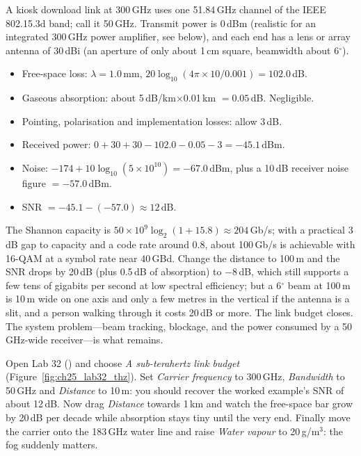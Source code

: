 \begin{worked}
A kiosk download link at 300\,GHz uses one 51.84\,GHz channel of the IEEE 802.15.3d band; call it
50\,GHz.
Transmit power is 0\,dBm (realistic for an integrated 300\,GHz power amplifier, see below), and each
end has a lens or array antenna of 30\,dBi (an aperture of only about 1\,cm square, beamwidth about
6$^\circ$).
\begin{itemize}
\item Free-space loss: $\lambda=1.0$\,mm, $20\log_{10}(4\pi\times10/0.001)=102.0$\,dB.
\item Gaseous absorption: about 5\,dB/km$\times$0.01\,km $=0.05$\,dB. Negligible.
\item Pointing, polarisation and implementation losses: allow 3\,dB.
\item Received power: $0+30+30-102.0-0.05-3=-45.1$\,dBm.
\item Noise: $-174+10\log_{10}(5\times10^{10})=-67.0$\,dBm, plus a 10\,dB receiver noise figure
$=-57.0$\,dBm.
\item SNR $=-45.1-(-57.0)\approx12$\,dB.
\end{itemize}
The Shannon capacity is $50\times10^9\log_2(1+15.8)\approx204$\,Gb/s; with a practical 3\,dB gap to
capacity and a code rate around 0.8, about 100\,Gb/s is achievable with 16-QAM at a symbol rate near
40\,GBd. Change the distance to 100\,m and the SNR drops by 20\,dB (plus 0.5\,dB of absorption) to
$-8$\,dB, which still supports a few tens of gigabits per second at low spectral efficiency; but a
6$^\circ$ beam at 100\,m is 10\,m wide on one axis and only a few metres in the vertical if the
antenna is a slit, and a person walking through it costs 20\,dB or more. The link budget closes. The
system problem---beam tracking, blockage, and the power consumed by a 50\,GHz-wide receiver---is what
remains.
\end{worked}


\begin{tryit}
Open Lab 32 () and choose \emph{A sub-terahertz link budget}
(Figure~\ref{fig:ch25_lab32_thz}). Set \emph{Carrier frequency} to 300\,GHz, \emph{Bandwidth} to
50\,GHz and \emph{Distance} to 10\,m: you should recover the worked example's SNR of about 12\,dB.
Now drag \emph{Distance} towards 1\,km and watch the free-space bar grow by 20\,dB per decade while
absorption stays tiny until the very end. Finally move the carrier onto the 183\,GHz water line and
raise \emph{Water vapour} to 20\,g/m$^3$: the fog suddenly matters.
\end{tryit}

